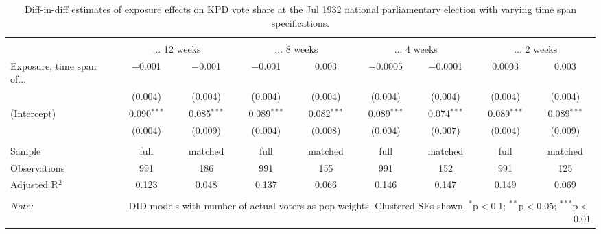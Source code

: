 
\begin{table}[!htbp] \centering 
  \caption{Diff-in-diff estimates of exposure effects on KPD vote share at the Jul 1932 national parliamentary election with varying time span specifications.\vspace{-.25cm}} 
  \label{tab:nsdap-voteshare-kpd-timespan-dd-1932-1} 
\scriptsize 
\begin{tabular}{@{\extracolsep{5pt}}lcccccccc} 
\\[-1.8ex]\hline 
\hline \\[-1.8ex] 
 & \multicolumn{2}{c}{... 12 weeks} & \multicolumn{2}{c}{... 8 weeks} & \multicolumn{2}{c}{... 4 weeks} & \multicolumn{2}{c}{... 2 weeks} \\ 
 \cmidrule(r){2-3}\cmidrule(r){4-5}\cmidrule(r){6-7}\cmidrule(r){8-9}Exposure, time span of... & $-$0.001 & $-$0.001 & $-$0.001 & 0.003 & $-$0.0005 & $-$0.0001 & 0.0003 & 0.003 \\ 
  & (0.004) & (0.004) & (0.004) & (0.004) & (0.004) & (0.004) & (0.004) & (0.004) \\ 
  (Intercept) & 0.090$^{***}$ & 0.085$^{***}$ & 0.089$^{***}$ & 0.082$^{***}$ & 0.089$^{***}$ & 0.074$^{***}$ & 0.089$^{***}$ & 0.089$^{***}$ \\ 
  & (0.004) & (0.009) & (0.004) & (0.008) & (0.004) & (0.007) & (0.004) & (0.009) \\ 
 \hline \\[-1.8ex] 
Sample & full & matched & full & matched & full & matched & full & matched \\ 
Observations & 991 & 186 & 991 & 155 & 991 & 152 & 991 & 125 \\ 
Adjusted R$^{2}$ & 0.123 & 0.048 & 0.137 & 0.066 & 0.146 & 0.147 & 0.149 & 0.069 \\ 
\hline 
\hline \\[-1.8ex] 
\textit{Note:}  & \multicolumn{8}{r}{DID models with number of actual voters as pop weights. Clustered SEs shown. $^{*}$p$<$0.1; $^{**}$p$<$0.05; $^{***}$p$<$0.01} \\ 
\end{tabular} 
\end{table} 
